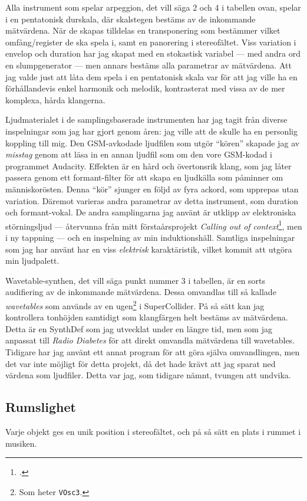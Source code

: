 \documentclass[11pt, a4paper]{article} %
\begin{document}
Alla instrument som spelar arpeggion, det vill säga 2 och 4 i tabellen ovan, spelar i en pentatonisk durskala, där skalstegen bestäms av de inkommande mätvärdena. När de skapas tilldelas en transponering som bestämmer vilket omfång/register de ska spela i, samt en panorering i stereofältet. Viss variation i envelop och duration har jag skapat med en stokastisk variabel --- med andra ord en slumpgenerator --- men annars bestäms alla parametrar av mätvärdena. Att jag valde just att låta dem spela i en pentatonisk skala var för att jag ville ha en förhållandevis enkel harmonik och melodik, kontrasterat med vissa av de mer komplexa, hårda klangerna. 

Ljudmaterialet i de samplingsbaserade instrumenten har jag tagit från diverse inspelningar som jag har gjort genom åren: jag ville att de skulle ha en personlig koppling till mig. Den GSM-avkodade ljudfilen som utgör ``kören'' skapade jag av \emph{misstag} genom att läsa in en annan ljudfil som om den vore GSM-kodad i programmet Audacity. Effekten är en hård och övertonsrik klang, som jag låter passera genom ett formant-filter för att skapa en ljudkälla som påminner om människorösten. Denna ``kör'' sjunger en följd av fyra ackord, som upprepas utan variation. Däremot varieras andra parametrar av detta instrument, som duration och formant-vokal. De andra samplingarna jag använt är utklipp av elektroniska störningsljud --- återvunna från mitt förstaårsprojekt \emph{Calling out of context}\footcite{jondell_calling_2019}, men i ny tappning --- och en inspelning av min induktionshäll. Samtliga inspelningar som jag har använt har en viss \emph{elektrisk} karaktäristik, vilket kommit att utgöra min ljudpalett. 

Wavetable-synthen, det vill säga punkt nummer 3 i tabellen, är en sorts audifiering av de inkommande mätvärdena. Dessa omvandlas till så kallade \emph{wavetables} som används av en \gls{ugen}\footnote{Som heter \texttt{VOsc3}.} i SuperCollider. På så sätt kan jag kontrollera tonhöjden samtidigt som klangfärgen helt bestäms av mätvärdena. Detta är en SynthDef som jag utvecklat under en längre tid, men som jag anpassat till \emph{Radio Diabetes} för att direkt omvandla mätvärdena till wavetables. Tidigare har jag använt ett annat program för att göra själva omvandlingen, men det var inte möjligt för detta projekt, då det hade krävt att jag sparat ned värdena som ljudfiler. Detta var jag, som tidigare nämnt, tvungen att undvika.

\subsection*{Rumslighet}
Varje objekt ges en unik position i stereofältet, och på så sätt en plats i rummet i musiken. 
\end{document}
